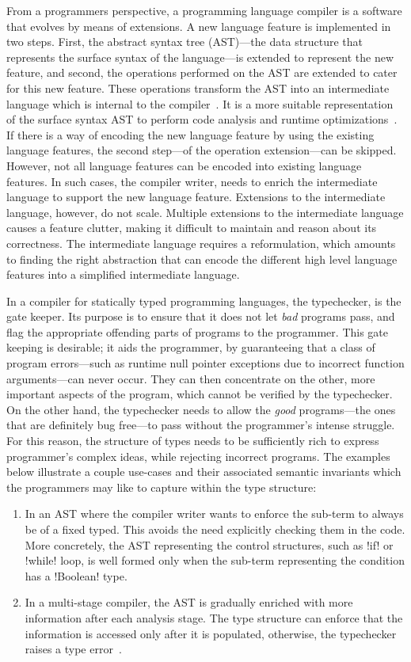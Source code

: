 \documentclass[screen,nonacm,manuscript,review]{acmart} %
\begin{document}
From a programmers perspective, a programming language compiler is
a software that evolves by means of extensions. A new language feature
is implemented in two steps. First, the abstract syntax tree (AST)---the
data structure that represents the surface syntax of the language---is
extended to represent the new feature, and second, the operations
performed on the AST are extended to cater for this new feature. These
operations transform the AST into an intermediate language which is internal to the
compiler~\cite{siek_compilation_2023}. It is a more suitable
representation of the surface syntax AST to perform code analysis and
runtime optimizations~\cite{aho_compilers_1986}.
If there is a way of encoding the new language feature by using the
existing language features, the second step---of the operation extension---can be
skipped. However, not all language features can be encoded
into existing language features. In such cases, the compiler writer, needs
to enrich the intermediate language to support the
new language feature. Extensions to the intermediate language,
however, do not scale. Multiple extensions to the intermediate
language causes a feature clutter, making it difficult to
maintain and reason about its correctness. The intermediate language
requires a reformulation, which amounts to finding the right
abstraction that can encode the different high level language features
into a simplified intermediate language.

In a compiler for statically typed programming languages, the
typechecker, is the gate keeper. Its purpose is to ensure that it does
not let \emph{bad} programs pass, and flag the appropriate offending
parts of programs to the programmer. This gate keeping is desirable;
it aids the programmer, by guaranteeing that a class of program
errors---such as runtime null pointer exceptions due to incorrect
function arguments---can never occur. They can then concentrate on the
other, more important aspects of the program, which cannot be verified
by the typechecker. On the other hand, the typechecker needs to allow
the \emph{good} programs---the ones that are definitely bug free---to
pass without the programmer's intense struggle. For
this reason, the structure of types needs to be sufficiently rich
to express programmer's complex ideas, while rejecting incorrect
programs. The examples below illustrate a couple use-cases and
their associated semantic invariants which the programmers may like to
capture within the type structure:
\begin{enumerate}
\item In an AST where the compiler writer wants to enforce the
  sub-term to always be of a fixed typed. This avoids the need
  explicitly checking them in the code.
  More concretely, the AST representing the control structures, such
  as !if! or !while! loop, is well formed only when the sub-term
  representing the condition has a !Boolean! type.
\item In a multi-stage compiler, the AST is gradually enriched with
  more information after each analysis stage. The type structure can
  enforce that the information is accessed only after it is populated,
  otherwise, the typechecker raises a type
  error~\cite{peyton_jones_trees_2017}.
\end{enumerate}
\end{document}
